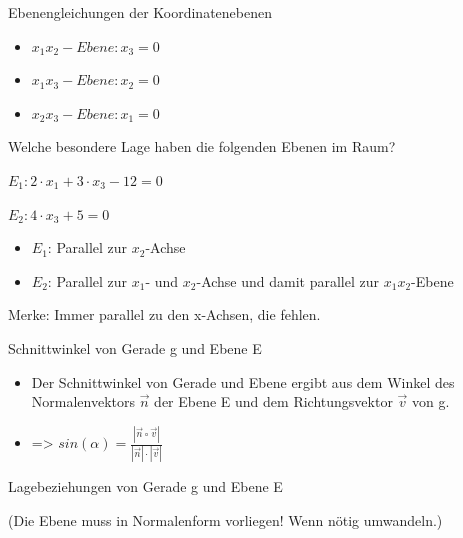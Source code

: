 \documentclass[paper=a6,landscape,ngerman,twoside=true,fontsize=12pt]{scrartcl}
\begin{document}
\begin{frage}
	Ebenengleichungen der Koordinatenebenen
\end{frage}
\begin{antwort}

	\begin{itemize} 
		\item $x_1x_2-Ebene: x_3=0$	
		\item $x_1x_3-Ebene: x_2=0$
		\item $x_2x_3-Ebene: x_1=0$
	\end{itemize} 
	
\end{antwort}
\begin{frage}
	Welche besondere Lage haben die folgenden Ebenen im Raum?
	
	$E_1: 2 \cdot x_1+3  \cdot x_3  -12 = 0$
	
	$E_2: 4 \cdot x_3 +5 = 0$	
	
\end{frage}
\begin{antwort}
	
	\begin{itemize} 
		\item $E_1$: Parallel zur $x_2$-Achse	
		\item $E_2$: Parallel zur $x_1$- und $x_2$-Achse und damit parallel zur $x_1x_2$-Ebene
	\end{itemize} 
	\bigskip
	Merke: Immer parallel zu den x-Achsen, die fehlen.
	
\end{antwort}
\begin{frage}
	Schnittwinkel von Gerade g und Ebene E	
	
\end{frage}
\begin{antwort}
	
	\Large	
	\begin{itemize} 
		\item Der Schnittwinkel von Gerade und Ebene ergibt aus dem Winkel des Normalenvektors $\vec{n}$ der Ebene E und dem Richtungsvektor $\vec{v}$ von g.  
		\item => $sin(\alpha)=\frac{|\vec{n} \circ \vec{v}|}{|\vec{n}|\cdot|\vec{v}|}$
	\end{itemize} 	
\end{antwort}
\begin{frage}
	Lagebeziehungen von Gerade g und Ebene E	
	\Large
	
	(Die Ebene muss in Normalenform vorliegen! Wenn nötig umwandeln.)
\end{frage}
\end{document}
